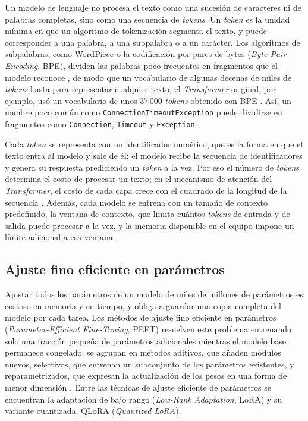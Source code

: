 Un modelo de lenguaje no procesa el texto como una sucesión de caracteres ni de palabras completas, sino como una secuencia de \textit{tokens}. Un \textit{token} es la unidad mínima en que un algoritmo de tokenización segmenta el texto, y puede corresponder a una palabra, a una subpalabra o a un carácter. Los algoritmos de subpalabras, como WordPiece o la codificación por pares de bytes (\textit{Byte Pair Encoding}, BPE), dividen las palabras poco frecuentes en fragmentos que el modelo reconoce \cite{karlsen2024_benchmark}, de modo que un vocabulario de algunas decenas de miles de \textit{tokens} basta para representar cualquier texto; el \textit{Transformer} original, por ejemplo, usó un vocabulario de unos 37\,000 \textit{tokens} obtenido con BPE \cite{vaswani2017_attention}. Así, un nombre poco común como \texttt{ConnectionTimeoutException} puede dividirse en fragmentos como \texttt{Connection}, \texttt{Timeout} y \texttt{Exception}.

Cada \textit{token} se representa con un identificador numérico, que es la forma en que el texto entra al modelo y sale de él: el modelo recibe la secuencia de identificadores y genera su respuesta prediciendo un \textit{token} a la vez. Por eso el número de \textit{tokens} determina el costo de procesar un texto; en el mecanismo de atención del \textit{Transformer}, el costo de cada capa crece con el cuadrado de la longitud de la secuencia \cite{vaswani2017_attention}. Además, cada modelo se entrena con un tamaño de contexto predefinido, la ventana de contexto, que limita cuántos \textit{tokens} de entrada y de salida puede procesar a la vez, y la memoria disponible en el equipo impone un límite adicional a esa ventana \cite{han2024_peft_survey}.

\subsection{Ajuste fino eficiente en parámetros}\label{sec:mt_peft}

 Ajustar todos los parámetros de un modelo de miles de millones de parámetros es costoso en memoria y en tiempo, y obliga a guardar una copia completa del modelo por cada tarea. Los métodos de ajuste fino eficiente en parámetros (\textit{Parameter-Efficient Fine-Tuning}, PEFT) resuelven este problema entrenando solo una fracción pequeña de parámetros adicionales mientras el modelo base permanece congelado; se agrupan en métodos aditivos, que añaden módulos nuevos, selectivos, que entrenan un subconjunto de los parámetros existentes, y reparametrizados, que expresan la actualización de los pesos en una forma de menor dimensión \cite{han2024_peft_survey}. Entre las técnicas de ajuste eficiente de parámetros se encuentran la adaptación de bajo rango (\textit{Low-Rank Adaptation}, LoRA) y su variante cuantizada, QLoRA (\textit{Quantized LoRA}).

